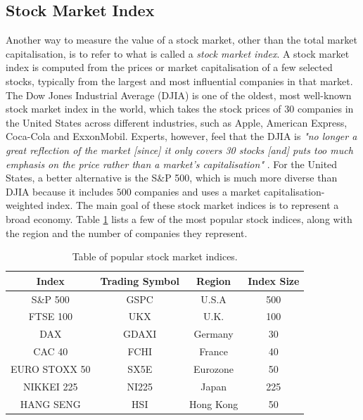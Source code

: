 \documentclass{UoYCSproject}
\begin{document}
\subsection{Stock Market Index}
Another way to measure the value of a stock market, other than the total market capitalisation, is to refer to what is called a \textit{stock market index}. A stock market index is computed from the prices or market capitalisation of a few selected stocks, typically from the largest and most influential companies in that market. The Dow Jones Industrial Average (DJIA) is one of the oldest, most well-known stock market index in the world, which takes the stock prices of 30 companies in the United States across different industries, such as Apple, American Express, Coca-Cola and ExxonMobil. Experts, however, feel that the DJIA is \textit{"no longer a great reflection of the market [since] it only covers 30 stocks [and] puts too much emphasis on the price rather than a market's capitalisation"} \cite{dowproblem}. For the United States, a better alternative is the S\&P 500, which is much more diverse than DJIA because it includes $500$ companies and uses a market capitalisation-weighted index. The main goal of these stock market indices is to represent a broad economy. Table \ref{tab:indices} lists a few of the most popular stock indices, along with the region and the number of companies they represent. 

\begin{table}[h]
    \centering
    \begin{tabular}{|c|c|c|c|} \hline
        \textbf{Index} & \textbf{Trading Symbol} & \textbf{Region} & \textbf{Index Size} \\ \hline
        S\&P 500 & GSPC & U.S.A & 500 \\
        FTSE 100 & UKX & U.K. & 100 \\
        DAX & GDAXI & Germany & 30 \\
        CAC 40 & FCHI & France & 40 \\
        EURO STOXX 50 & SX5E & Eurozone & 50 \\
        NIKKEI 225 & NI225 & Japan & 225 \\
        HANG SENG & HSI & Hong Kong & 50 \\
        \hline
    \end{tabular}
    \caption{Table of popular stock market indices.}
    \label{tab:indices}
\end{table}
\end{document}

